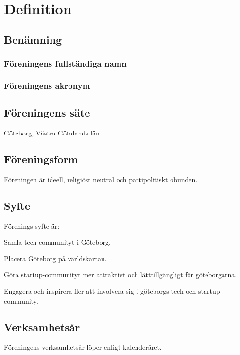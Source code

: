 \section{Definition}

\subsection{Benämning}

\subsubsection{Föreningens fullständiga namn}
\GBGSHFULL{}

\subsubsection{Föreningens akronym}
\GBGSH{}

\subsection{Föreningens säte}
Göteborg, Västra Götalands län

\subsection{Föreningsform}
Föreningen är ideell, religiöst neutral och partipolitiskt obunden. 

\subsection{Syfte}
Förenings syfte är:
\begin{att}
	\item Samla tech-communityt i Göteborg.
	\item Placera Göteborg på världskartan.
	\item Göra startup-communityt mer attraktivt och lätttillgängligt för göteborgarna.
	\item Engagera och inspirera fler att involvera sig i göteborgs tech och startup community.
\end{att}

\subsection{Verksamhetsår}
Föreningens verksamhetsår löper enligt kalenderåret. 